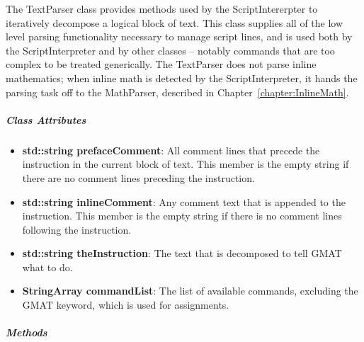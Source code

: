 The TextParser class provides methods used by the ScriptIntererpter to iteratively decompose a
logical block of text.  This class supplies all of the low level parsing functionality necessary to
manage script lines, and is used both by the ScriptInterpreter and by other classes -- notably
commands that are too complex to be treated generically.  The TextParser does not parse inline
mathematics; when inline math is detected by the ScriptInterpreter, it hands the parsing task off
to the MathParser, described in Chapter~\ref{chapter:InlineMath}.

\subparagraph{\textit{Class Attributes}}

\begin{itemize}
\item \textbf{std::string prefaceComment}: All comment lines that precede the instruction in the
current block of text.  This member is the empty string if there are no comment lines preceding the
instruction.
\item \textbf{std::string inlineComment}: Any comment text that is appended to the instruction.
This member is the empty string if there is no comment lines following the instruction.
\item \textbf{std::string theInstruction}: The text that is decomposed to tell GMAT what to do.
\item \textbf{StringArray commandList}: The list of available commands, excluding the GMAT keyword,
which is used for assignments.
\end{itemize}

\subparagraph{\textit{Methods}}

